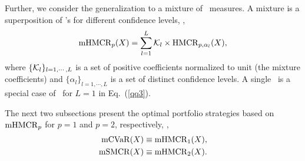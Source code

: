 Further, we consider the generalization to a mixture of \HMCR\ measures.
A mixture is a superposition of \HMCR's for different confidence levels, \ie,
\begin{equation}
    \mHMCR_p(X) = \sum_{l=1}^L \cK_l\times \HMCR_{p, \alpha_l}(X),
    \label{qq3}
\end{equation}
where $\{{\cal K}_l\}_{l=1,\cdots,L}$ is a set of positive coefficients normalized to unit (the mixture coefficients) and
$\{\alpha_l\}_{l=1,\cdots,L}$ is a set of distinct confidence levels. A single \HMCR\ is a special case of \mHMCR\ for $L=1$ in Eq.~(\ref{qq3}).

The next two subsections present the optimal portfolio strategies based on ${\rm mHMCR}_p$ for $p=1$ and $p=2$, respectively, \ie,
\begin{align}
    \mCVaR(X) &\equiv \mHMCR_1(X), \label{qq4} \\
    \mSMCR(X) &\equiv \mHMCR_2(X). \label{qq5}
\end{align}


\BackToContents





